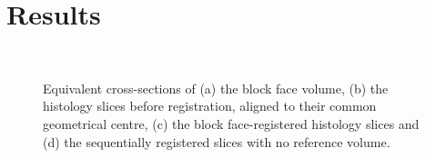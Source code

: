 \section{Results} %
\label{sec:results}
  \begin{figure}[!t]
    \centering
    \\
    \caption{Equivalent cross-sections of (a) the block face volume, (b) the histology slices before registration, aligned to their common geometrical centre, (c) the block face-registered histology slices and (d) the sequentially registered slices with no reference volume.}
    \label{fig:}
  \end{figure}
  
